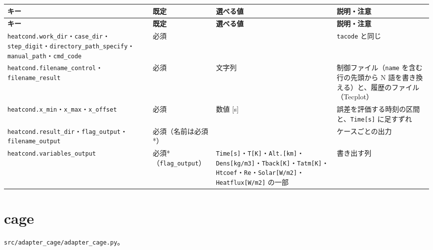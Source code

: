 \begingroup\small
\begin{longtable}{>{\raggedright\arraybackslash}p{}>{\raggedright\arraybackslash}p{}>{\raggedright\arraybackslash}p{}>{\raggedright\arraybackslash}p{}}
\toprule
\textbf{キー} & \textbf{既定} & \textbf{選べる値} & \textbf{説明・注意} \\
\midrule
\endfirsthead
\toprule
\textbf{キー} & \textbf{既定} & \textbf{選べる値} & \textbf{説明・注意} \\
\midrule
\endhead
\bottomrule
\endlastfoot
\texttt{heatcond.\allowbreak{}work\_\allowbreak{}dir}・\texttt{case\_\allowbreak{}dir}・\texttt{step\_\allowbreak{}digit}・\texttt{directory\_\allowbreak{}path\_\allowbreak{}specify}・\texttt{manual\_\allowbreak{}path}・\texttt{cmd\_\allowbreak{}code} & 必須 &  & \texttt{tacode} と同じ \\
\texttt{heatcond.\allowbreak{}filename\_\allowbreak{}control}・\texttt{filename\_\allowbreak{}result} & 必須 & 文字列 & 制御ファイル（\texttt{name} を含む行の先頭から N 語を書き換える）と、履歴のファイル（Tecplot） \\
\texttt{heatcond.\allowbreak{}x\_\allowbreak{}min}・\texttt{x\_\allowbreak{}max}・\texttt{x\_\allowbreak{}offset} & 必須 & 数値 [s] & 誤差を評価する時刻の区間と、\texttt{Time[s]\allowbreak{}} に足すずれ \\
\texttt{heatcond.\allowbreak{}result\_\allowbreak{}dir}・\texttt{flag\_\allowbreak{}output}・\texttt{filename\_\allowbreak{}output} & 必須（名前は必須*） &  & ケースごとの出力 \\
\texttt{heatcond.\allowbreak{}variables\_\allowbreak{}output} & 必須*（\texttt{flag\_\allowbreak{}output}） & \texttt{Time[s]\allowbreak{}}・\texttt{T[K]\allowbreak{}}・\texttt{Alt.\allowbreak{}[km]\allowbreak{}}・\texttt{Dens[kg/\allowbreak{}m3]\allowbreak{}}・\texttt{Tback[K]\allowbreak{}}・\texttt{Tatm[K]\allowbreak{}}・\texttt{Htcoef}・\texttt{Re}・\texttt{Solar[W/\allowbreak{}m2]\allowbreak{}}・\texttt{Heatflux[W/\allowbreak{}m2]\allowbreak{}} の一部 & 書き出す列 \\
\end{longtable}
\endgroup

\section{cage}

\texttt{src/\allowbreak{}adapter\_\allowbreak{}cage/\allowbreak{}adapter\_\allowbreak{}cage.\allowbreak{}py}。

